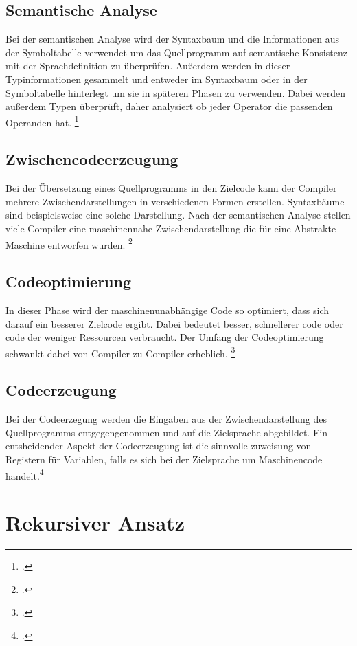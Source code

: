 \subsection{Semantische Analyse}
Bei der semantischen Analyse wird der Syntaxbaum und die Informationen aus der Symboltabelle verwendet um das Quellprogramm auf semantische Konsistenz mit der Sprachdefinition zu überprüfen. Außerdem werden in dieser Typinformationen gesammelt und entweder im Syntaxbaum oder in der Symboltabelle hinterlegt um sie in späteren Phasen zu verwenden. Dabei werden außerdem Typen überprüft, daher analysiert ob jeder Operator die passenden Operanden hat. \footcite[Vgl.][S. 9ff]{Ullmann2008}
\subsection{Zwischencodeerzeugung}
Bei der Übersetzung eines Quellprogramms in den Zielcode kann der Compiler mehrere Zwischendarstellungen in verschiedenen Formen erstellen. Syntaxbäume sind beispielsweise eine solche Darstellung. Nach der semantischen Analyse stellen viele Compiler eine maschinennahe Zwischendarstellung die für eine Abstrakte Maschine entworfen wurden.  \footcite[Vgl.][S. 11]{Ullmann2008}
\subsection{Codeoptimierung}
In dieser Phase wird der maschinenunabhängige Code so optimiert, dass sich darauf ein besserer Zielcode ergibt. Dabei bedeutet besser, schnellerer code oder code der weniger Ressourcen verbraucht. Der Umfang der Codeoptimierung schwankt dabei von Compiler zu Compiler erheblich.  \footcite[Vgl.][S. 11f]{Ullmann2008}
\subsection{Codeerzeugung}
Bei der Codeerzegung werden die Eingaben aus der Zwischendarstellung des Quellprogramms entgegengenommen und auf die Zielsprache abgebildet. Ein entsheidender Aspekt der Codeerzeugung ist die sinnvolle zuweisung von Registern für Variablen, falls es sich bei der Zielsprache um Maschinencode handelt.\footcite[Vgl.][S. 13]{Ullmann2008}

\section{Rekursiver Ansatz}